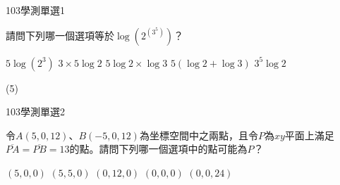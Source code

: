 \begin{QUESTIONS}
    \begin{QUESTION}
        \begin{ExamInfo}{103}{學測}{單選}{1}
        \end{ExamInfo}
        \begin{ExamAnsRateInfo}{82}{99}{93}{54}
        \end{ExamAnsRateInfo}
        \begin{QBODY}
            請問下列哪一個選項等於$\log \left( {{2}^{\left( {{3}^{5}} \right)}} \right)$？
			\begin{QOPS}
				\QOP $5\log \left( {{2}^{3}} \right)$
				\QOP $3\times 5\log 2$
				\QOP $5\log 2\times \log 3$
				\QOP $5\left( \log 2+\log 3 \right)$
				\QOP ${{3}^{5}}\log 2$
			\end{QOPS}
        \end{QBODY}
        \begin{QFROMS}
        \end{QFROMS}
        \begin{QTAGS}\end{QTAGS}
        \begin{QANS}
            (5)
        \end{QANS}
        \begin{QSOLLIST}
        \end{QSOLLIST}
        \begin{QEMPTYSPACE}
        \end{QEMPTYSPACE}
    \end{QUESTION}
    \begin{QUESTION}
        \begin{ExamInfo}{103}{學測}{單選}{2}
        \end{ExamInfo}
        \begin{ExamAnsRateInfo}{74}{95}{85}{42}
        \end{ExamAnsRateInfo}
        \begin{QBODY}
            令$A(5,0,12)$、$B(-5,0,12)$為坐標空間中之兩點，且令$P$為$xy$平面上滿足$\overline{PA}=\overline{PB}=13$的點。請問下列哪一個選項中的點可能為$P$？
			\begin{QOPS}
				\QOP $(5,0,0)$
				\QOP $(5,5,0)$
				\QOP $(0,12,0)$
				\QOP $(0,0,0)$
				\QOP $(0,0,24)$
			\end{QOPS}
        \end{QBODY}
        \begin{QFROMS}

\end{QFROMS}
\end{QUESTION}
\end{QUESTIONS}
